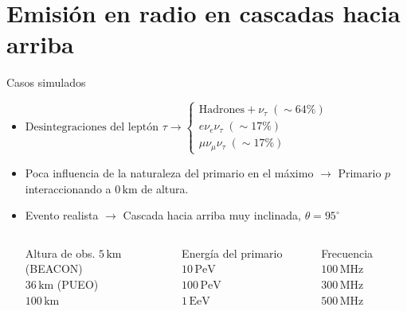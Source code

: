 \documentclass{beamer}
\begin{document}
	\section{Emisión en radio en cascadas hacia arriba}


\begin{frame}{Casos simulados}
	\begin{itemize}
		\item $\text{Desintegraciones del leptón } \tau\rightarrow\left\{\begin{array}{l}\text{Hadrones}+\nu_\tau\; (\sim64\%)\\e\nu_e\nu_\tau\;(\sim 17\%)\\\mu \nu_\mu\nu_\tau\;(\sim 17\%)\end{array}\right.$
		\item Poca influencia de la naturaleza del primario en el máximo $\rightarrow$ Primario $p$ interaccionando a $0\,\mathrm{km}$ de altura.
		\item Evento realista $\rightarrow$ Cascada hacia arriba muy inclinada, $\theta = 95^\circ$
		\pause\begin{columns}
			\begin{block}{\centering Altura de obs.}
				\centering $5\,\mathrm{km}$ (BEACON)\\$36\,\mathrm{km}$ (PUEO)\\$100\,\mathrm{km}$
			\end{block}
			\begin{block}{\centering Energía del primario}
				\centering $10\,\mathrm{PeV}$\\$100\,\mathrm{PeV}$\\$1\,\mathrm{EeV}$
			\end{block}

	\begin{block}{\centering Frecuencia}
		\centering $100\,\mathrm{MHz}$\\$300\,\mathrm{MHz}$\\$500\,\mathrm{MHz}$
	\end{block}
		\end{columns}
	\end{itemize}
\end{frame}
\end{document}
